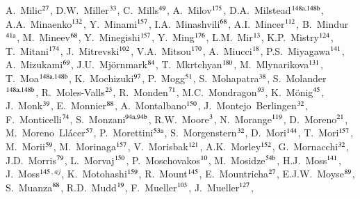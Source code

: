 \begin{flushleft}
A.~Milic$^\textrm{\scriptsize 27}$,
D.W.~Miller$^\textrm{\scriptsize 33}$,
C.~Mills$^\textrm{\scriptsize 49}$,
A.~Milov$^\textrm{\scriptsize 175}$,
D.A.~Milstead$^\textrm{\scriptsize 148a,148b}$,
A.A.~Minaenko$^\textrm{\scriptsize 132}$,
Y.~Minami$^\textrm{\scriptsize 157}$,
I.A.~Minashvili$^\textrm{\scriptsize 68}$,
A.I.~Mincer$^\textrm{\scriptsize 112}$,
B.~Mindur$^\textrm{\scriptsize 41a}$,
M.~Mineev$^\textrm{\scriptsize 68}$,
Y.~Minegishi$^\textrm{\scriptsize 157}$,
Y.~Ming$^\textrm{\scriptsize 176}$,
L.M.~Mir$^\textrm{\scriptsize 13}$,
K.P.~Mistry$^\textrm{\scriptsize 124}$,
T.~Mitani$^\textrm{\scriptsize 174}$,
J.~Mitrevski$^\textrm{\scriptsize 102}$,
V.A.~Mitsou$^\textrm{\scriptsize 170}$,
A.~Miucci$^\textrm{\scriptsize 18}$,
P.S.~Miyagawa$^\textrm{\scriptsize 141}$,
A.~Mizukami$^\textrm{\scriptsize 69}$,
J.U.~Mj\"ornmark$^\textrm{\scriptsize 84}$,
T.~Mkrtchyan$^\textrm{\scriptsize 180}$,
M.~Mlynarikova$^\textrm{\scriptsize 131}$,
T.~Moa$^\textrm{\scriptsize 148a,148b}$,
K.~Mochizuki$^\textrm{\scriptsize 97}$,
P.~Mogg$^\textrm{\scriptsize 51}$,
S.~Mohapatra$^\textrm{\scriptsize 38}$,
S.~Molander$^\textrm{\scriptsize 148a,148b}$,
R.~Moles-Valls$^\textrm{\scriptsize 23}$,
R.~Monden$^\textrm{\scriptsize 71}$,
M.C.~Mondragon$^\textrm{\scriptsize 93}$,
K.~M\"onig$^\textrm{\scriptsize 45}$,
J.~Monk$^\textrm{\scriptsize 39}$,
E.~Monnier$^\textrm{\scriptsize 88}$,
A.~Montalbano$^\textrm{\scriptsize 150}$,
J.~Montejo~Berlingen$^\textrm{\scriptsize 32}$,
F.~Monticelli$^\textrm{\scriptsize 74}$,
S.~Monzani$^\textrm{\scriptsize 94a,94b}$,
R.W.~Moore$^\textrm{\scriptsize 3}$,
N.~Morange$^\textrm{\scriptsize 119}$,
D.~Moreno$^\textrm{\scriptsize 21}$,
M.~Moreno~Ll\'acer$^\textrm{\scriptsize 57}$,
P.~Morettini$^\textrm{\scriptsize 53a}$,
S.~Morgenstern$^\textrm{\scriptsize 32}$,
D.~Mori$^\textrm{\scriptsize 144}$,
T.~Mori$^\textrm{\scriptsize 157}$,
M.~Morii$^\textrm{\scriptsize 59}$,
M.~Morinaga$^\textrm{\scriptsize 157}$,
V.~Morisbak$^\textrm{\scriptsize 121}$,
A.K.~Morley$^\textrm{\scriptsize 152}$,
G.~Mornacchi$^\textrm{\scriptsize 32}$,
J.D.~Morris$^\textrm{\scriptsize 79}$,
L.~Morvaj$^\textrm{\scriptsize 150}$,
P.~Moschovakos$^\textrm{\scriptsize 10}$,
M.~Mosidze$^\textrm{\scriptsize 54b}$,
H.J.~Moss$^\textrm{\scriptsize 141}$,
J.~Moss$^\textrm{\scriptsize 145}$$^{,aj}$,
K.~Motohashi$^\textrm{\scriptsize 159}$,
R.~Mount$^\textrm{\scriptsize 145}$,
E.~Mountricha$^\textrm{\scriptsize 27}$,
E.J.W.~Moyse$^\textrm{\scriptsize 89}$,
S.~Muanza$^\textrm{\scriptsize 88}$,
R.D.~Mudd$^\textrm{\scriptsize 19}$,
F.~Mueller$^\textrm{\scriptsize 103}$,
J.~Mueller$^\textrm{\scriptsize 127}$,
$$
\end{flushleft}
